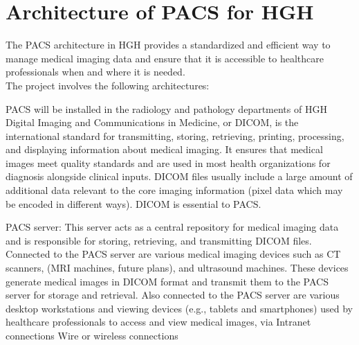 \documentclass{article}
\begin{document}
\section{Architecture of PACS for HGH}

The PACS architecture in HGH provides a standardized and efficient way to manage medical imaging data and ensure that it is accessible to healthcare professionals when and where it is needed.\\
The project involves the following architectures:

\begin{outline}
    \1 PACS will be installed in the radiology and pathology departments of HGH
        \2 Digital Imaging and Communications in Medicine, or DICOM, is the international standard for transmitting, storing, retrieving, printing, processing, and displaying information about medical imaging. It ensures that medical images meet quality standards and are used in most health organizations for diagnosis alongside clinical inputs. DICOM files usually include a large amount of additional data relevant to the core imaging information (pixel data which may be encoded in different ways). DICOM is essential to PACS.

        \2 PACS server: This server acts as a central repository for medical imaging data and is responsible for storing, retrieving, and transmitting DICOM files.
        \2 Connected to the PACS server are various medical imaging devices such as CT scanners, (MRI machines, future plans), and ultrasound machines. These devices generate medical images in DICOM format and transmit them to the PACS server for storage and retrieval.
        \2 Also connected to the PACS server are various desktop workstations and viewing devices (e.g., tablets and smartphones) used by healthcare professionals to access and view medical images, via 
            \3 Intranet connections
            \3 Wire or wireless connections


\end{outline}
\end{document}
